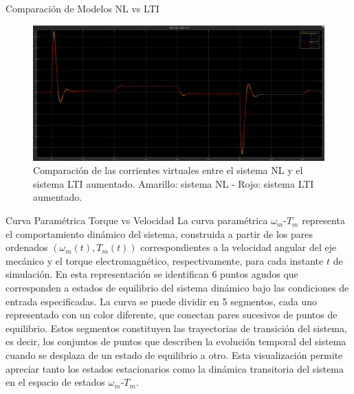 \documentclass[12pt]{beamer}
\begin{document}
\begin{frame}{Comparación de Modelos NL vs LTI}\scriptsize
    \begin{figure}[H]
    \centering
    \includegraphics[width=1\textwidth]{Imagenes/ComparativaCorrientesVirtuales.png}
    \caption{Comparación de las corrientes virtuales entre el sistema NL y el sistema LTI aumentado. Amarillo: sistema NL - Rojo: sistema LTI aumentado.}
    \label{fig:ComparativaCorrientesVirtuales}
\end{figure}
\end{frame}

\begin{frame}{Curva Paramétrica Torque vs Velocidad}\small
La curva paramétrica $\omega_m$-$T_m$ representa el comportamiento dinámico del sistema, construida a partir de los pares ordenados $(\omega_m(t),T_m(t))$ correspondientes a la velocidad angular del eje mecánico y el torque electromagnético, respectivamente, para cada instante $t$ de simulación. En esta representación se identifican 6 puntos agudos que corresponden a estados de equilibrio del sistema dinámico bajo las condiciones de entrada especificadas. La curva se puede dividir en 5 segmentos, cada uno representado con un color diferente, que conectan pares sucesivos de puntos de equilibrio. Estos segmentos constituyen las trayectorias de transición del sistema, es decir, los conjuntos de puntos que describen la evolución temporal del sistema cuando se desplaza de un estado de equilibrio a otro. Esta visualización permite apreciar tanto los estados estacionarios como la dinámica transitoria del sistema en el espacio de estados $\omega_m$-$T_m$.    
\end{frame}
\end{document}
